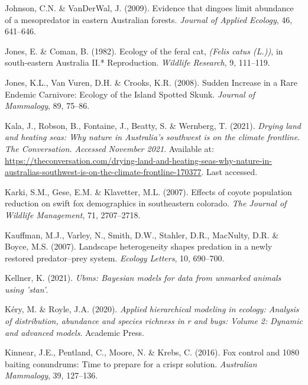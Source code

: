 \documentclass[11pt,a4paper,titlepage,twoside,openright]{style/unimelbthesis}
\begin{document}
\begin{mainmatter}
\leavevmode\hypertarget{ref-johnson2009evidence}{}%
Johnson, C.N. \& VanDerWal, J. (2009). Evidence that dingoes limit abundance of a mesopredator in eastern Australian forests. \emph{Journal of Applied Ecology}, 46, 641--646.

\leavevmode\hypertarget{ref-jones1982ecology}{}%
Jones, E. \& Coman, B. (1982). Ecology of the feral cat, \emph{(Felis catus (L.))}, in south-eastern Australia II.* Reproduction. \emph{Wildlife Research}, 9, 111--119.

\leavevmode\hypertarget{ref-jones2008sudden}{}%
Jones, K.L., Van Vuren, D.H. \& Crooks, K.R. (2008). Sudden Increase in a Rare Endemic Carnivore: Ecology of the Island Spotted Skunk. \emph{Journal of Mammalogy}, 89, 75--86.

\leavevmode\hypertarget{ref-drying2021kala}{}%
Kala, J., Robson, B., Fontaine, J., Beatty, S. \& Wernberg, T. (2021). \emph{Drying land and heating seas: Why nature in Australia's southwest is on the climate frontline}. \emph{The Conversation. Accessed November 2021}. Available at: \url{https://theconversation.com/drying-land-and-heating-seas-why-nature-in-australias-southwest-is-on-the-climate-frontline-170377}. Last accessed.

\leavevmode\hypertarget{ref-karki2007effects}{}%
Karki, S.M., Gese, E.M. \& Klavetter, M.L. (2007). Effects of coyote population reduction on swift fox demographics in southeastern colorado. \emph{The Journal of Wildlife Management}, 71, 2707--2718.

\leavevmode\hypertarget{ref-kauffman2007landscape}{}%
Kauffman, M.J., Varley, N., Smith, D.W., Stahler, D.R., MacNulty, D.R. \& Boyce, M.S. (2007). Landscape heterogeneity shapes predation in a newly restored predator--prey system. \emph{Ecology Letters}, 10, 690--700.

\leavevmode\hypertarget{ref-ubms}{}%
Kellner, K. (2021). \emph{Ubms: Bayesian models for data from unmarked animals using 'stan'}.

\leavevmode\hypertarget{ref-kery2020applied}{}%
Kéry, M. \& Royle, J.A. (2020). \emph{Applied hierarchical modeling in ecology: Analysis of distribution, abundance and species richness in r and bugs: Volume 2: Dynamic and advanced models}. Academic Press.

\leavevmode\hypertarget{ref-kinnear2016fox}{}%
Kinnear, J.E., Pentland, C., Moore, N. \& Krebs, C. (2016). Fox control and 1080 baiting conundrums: Time to prepare for a crispr solution. \emph{Australian Mammalogy}, 39, 127--136.


\end{mainmatter}
\end{document}
